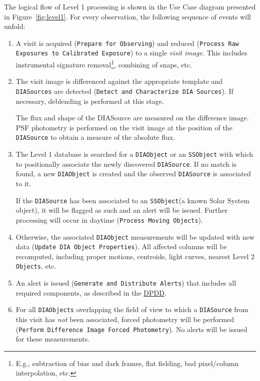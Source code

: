 \documentclass[12pt]{article}
\newcommand{\code}[1]{\texttt{#1}}
\newcommand{\DIASource}{\code{DIASource}\xspace}
\newcommand{\DIASources}{\code{DIASources}\xspace}
\newcommand{\DIAObject}{\code{DIAObject}\xspace}
\newcommand{\DIAObjects}{\code{DIAObjects}\xspace}
\newcommand{\DB}{{Level 1 database}\xspace}
\newcommand{\Objects}{\code{Objects}\xspace}
\newcommand{\SSObject}{\code{SSObject}\xspace}
\newcommand{\ds}[2]{{\color{blue} \href{https://docushare.lsstcorp.org/docushare/dsweb/Get/#1}{#2}}\xspace}
\newcommand{\DPDD}{\ds{LSE-163}{DPDD}}
\newcommand{\uc}[1]{{\tt #1}}
\begin{document}
The logical flow of Level 1 processing is shown in the Use Case diagram presented in Figure~\ref{fig:level1}. For every observation, the following sequence of events will unfold:
%
\begin{enumerate}
\item A visit is acquired (\uc{Prepare for Observing}) and reduced (\uc{Process Raw Exposures to Calibrated Exposure}) to a single {\em visit image}. This includes instrumental signature removal\footnote{E.g., subtraction of bias and dark frames, flat fielding, bad pixel/column interpolation, etc.}, combining of snaps, etc.

\item The visit image is differenced against the appropriate template and \DIASources are detected (\uc{Detect and Characterize DIA Sources}). If necessary, deblending is performed at this stage.

The flux and shape of the DIASource are measured on the difference image. PSF photometry is performed on the visit image at the position of the \DIASource to obtain a measure of the absolute flux.

\item The \DB is searched for a \DIAObject or an \SSObject with which to positionally associate the newly discovered \DIASource. If no match is found, a new \DIAObject is created and the observed \DIASource is associated to it.

If the \DIASource has been associated to an \SSObject (a known Solar System object), it will be flagged as such and an alert will be issued. Further processing will occur in daytime (\uc{Process Moving Objects}).

\item Otherwise, the associated \DIAObject measurements will be updated with new data (\uc{Update DIA Object Properties}). All affected columns will be recomputed, including proper motions, centroids, light curves, nearest Level 2 \Objects, etc.

\item An alert is issued (\uc{Generate and Distribute Alerts}) that includes all required components, as described in the \DPDD.

\item For all \DIAObjects overlapping the field of view to which a \DIASource from this visit has {\em not} been associated, forced photometry will be performed (\uc{Perform Difference Image Forced Photometry}).  No alerts will be issued for these measurements.

\end{enumerate}
\end{document}
